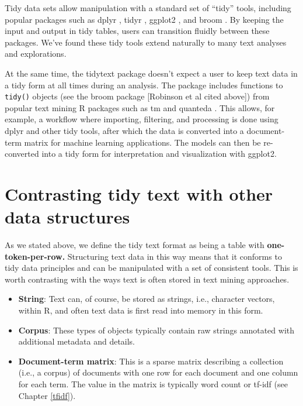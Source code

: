 \documentclass[
]{book}
\providecommand{\tightlist}{%
  \setlength{\itemsep}{0pt}\setlength{\parskip}{0pt}}
\begin{document}
Tidy data sets allow manipulation with a standard set of ``tidy'' tools, including popular packages such as dplyr \citep{R-dplyr}, tidyr \citep{R-tidyr}, ggplot2 \citep{R-ggplot2}, and broom \citep{R-broom}. By keeping the input and output in tidy tables, users can transition fluidly between these packages. We've found these tidy tools extend naturally to many text analyses and explorations.

At the same time, the tidytext package doesn't expect a user to keep text data in a tidy form at all times during an analysis. The package includes functions to \texttt{tidy()} objects (see the broom package {[}Robinson et al cited above{]}) from popular text mining R packages such as tm \citep{tm} and quanteda \citep{R-quanteda}. This allows, for example, a workflow where importing, filtering, and processing is done using dplyr and other tidy tools, after which the data is converted into a document-term matrix for machine learning applications. The models can then be re-converted into a tidy form for interpretation and visualization with ggplot2.

\hypertarget{contrasting-tidy-text-with-other-data-structures}{%
\section{Contrasting tidy text with other data structures}\label{contrasting-tidy-text-with-other-data-structures}}

As we stated above, we define the tidy text format as being a table with \textbf{one-token-per-row.} Structuring text data in this way means that it conforms to tidy data principles and can be manipulated with a set of consistent tools. This is worth contrasting with the ways text is often stored in text mining approaches.

\begin{itemize}
\tightlist
\item
  \textbf{String}: Text can, of course, be stored as strings, i.e., character vectors, within R, and often text data is first read into memory in this form.
\item
  \textbf{Corpus}: These types of objects typically contain raw strings annotated with additional metadata and details.
\item
  \textbf{Document-term matrix}: This is a sparse matrix describing a collection (i.e., a corpus) of documents with one row for each document and one column for each term. The value in the matrix is typically word count or tf-idf (see Chapter \ref{tfidf}).
\end{itemize}
\end{document}
